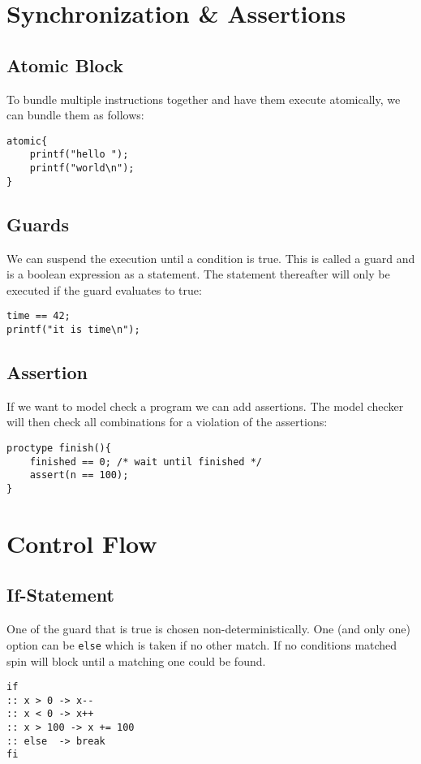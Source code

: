 \documentclass{sciposter}
\begin{document}
\begin{multicols}{3}
\section*{Synchronization \& Assertions}
\subsection*{Atomic Block}
To bundle multiple instructions together and have them execute atomically, we can bundle them as follows:

\begin{lstlisting}[language=promela]
atomic{
	printf("hello ");
	printf("world\n");
}
\end{lstlisting}

\subsection*{Guards}
We can suspend the execution until a condition is true. This is called a guard and is a boolean expression as a statement. The statement thereafter will only be executed if the guard evaluates to true:

\begin{lstlisting}[language=promela]
time == 42;
printf("it is time\n");
\end{lstlisting}

\subsection*{Assertion}
If we want to model check a program we can add assertions. The model checker will then check all combinations for a violation of the assertions:

\begin{lstlisting}[language=promela]
proctype finish(){
	finished == 0; /* wait until finished */
	assert(n == 100);
}
\end{lstlisting}


\section*{Control Flow}

\subsection*{If-Statement}
One of the guard that is true is chosen non-deterministically. One (and only one) option can be \texttt{else} which is taken if no other match. If no conditions matched spin will block until a matching one could be found.
\begin{lstlisting}[language=promela]
if
:: x > 0 -> x--
:: x < 0 -> x++
:: x > 100 -> x += 100
:: else  -> break
fi
\end{lstlisting}





\end{multicols}
\end{document}
